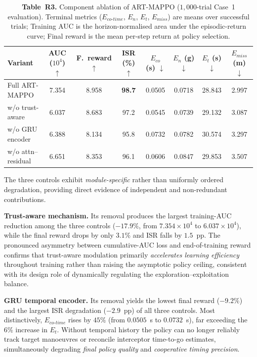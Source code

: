 \documentclass[11pt]{article}
\begin{document}
\begin{table}[h]
\centering
\captionsetup{font=small}
\caption*{\small\textbf{Table~R3.} Component ablation of ART-MAPPO ($1{,}000$-trial Case~1
evaluation). Terminal metrics ($E_{co\text{-}time}$, $E_n$, $E_t$, $E_{miss}$) are means
over successful trials; Training AUC is the horizon-normalised area under the episodic-return
curve; Final reward is the mean per-step return at policy selection.}
\renewcommand{\arraystretch}{1.1}
\setlength{\tabcolsep}{3pt}
\footnotesize
\begin{tabular}{lccccccc}
\hline\hline
Variant
  & AUC ($10^4$) $\uparrow$
  & F.\ reward $\uparrow$
  & ISR (\%) $\uparrow$
  & $E_{co}$ (s) $\downarrow$
  & $E_n$ (g) $\downarrow$
  & $E_t$ (s) $\downarrow$
  & $E_{miss}$ (m) $\downarrow$ \\ \hline
Full ART-MAPPO               & 7.354 & 8.958 & \textbf{98.7} & 0.0505 & 0.0718 & 28.843 & 2.997 \\
w/o trust-aware              & 6.037 & 8.683 & 97.2          & 0.0545 & 0.0739 & 29.132 & 3.087 \\
w/o GRU encoder              & 6.388 & 8.134 & 95.8          & 0.0732 & 0.0782 & 30.574 & 3.297 \\
w/o attn--residual           & 6.651 & 8.353 & 96.1          & 0.0606 & 0.0847 & 29.853 & 3.507 \\ \hline
\end{tabular}
\end{table}

The three controls exhibit \emph{module-specific} rather than uniformly ordered degradation,
providing direct evidence of independent and non-redundant contributions.

\textbf{Trust-aware mechanism.}  Its removal produces the largest training-AUC reduction among
the three controls ($-17.9\%$, from $7.354\!\times\!10^4$ to $6.037\!\times\!10^4$), while the
final reward drops by only $3.1\%$ and ISR falls by $1.5$~pp.  The pronounced asymmetry between
cumulative-AUC loss and end-of-training reward confirms that trust-aware modulation primarily
\emph{accelerates learning efficiency} throughout training rather than raising the asymptotic
policy ceiling, consistent with its design role of dynamically regulating the
exploration--exploitation balance.

\textbf{GRU temporal encoder.}  Its removal yields the lowest final reward ($-9.2\%$) and the
largest ISR degradation ($-2.9$~pp) of all three controls.  Most distinctively,
$E_{co\text{-}time}$ rises by $45\%$ (from $0.0505$~s to $0.0732$~s), far exceeding the $6\%$
increase in $E_t$.  Without temporal history the policy can no longer reliably track target
manoeuvres or reconcile interceptor time-to-go estimates, simultaneously degrading
\emph{final policy quality} and \emph{cooperative timing precision}.
\end{document}
